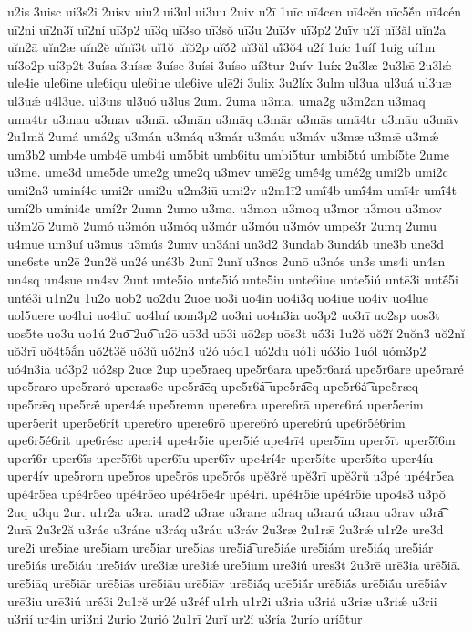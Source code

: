 {u2is
3uisc
ui3s2i
2uisv
uiu2
ui3ul
ui3uu
2uiv
u2ī
1uīc
uī4cen
uī4cĕn
uīc5ĕ́n
uī4cén
uī2ni
uī2n3ĭ
uī2ní
uī3p2
uī3q
uī3so
uī3sŏ
uī3u
2uī3v
uī́3p2
2uī́v
u2ĭ
uĭ3ăl
uĭn2a
uĭn2ā
uĭn2æ
uĭn2ĕ
uĭnĭ3t
uĭ1ŏ
uĭŏ2p
uĭŏ́2
uĭ3ŭl
uĭ́3ŏ4
u2í
1uíc
1uíf
1uíg
uí1m
uí3o2p
uí3p2t
3uísa
3uísæ
3uíse
3uísi
3uíso
uí3tur
2uív
1uíx
2u3læ
2u3lǣ
2u3lǽ
ule4ie
ule6ine
ule6iqu
ule6iue
ule6ive
ulē2i
3ulix
3u2líx
3ulm
ul3ua
ul3uá
ul3uæ
ul3uǽ
u4l3ue.
ul3uīs
ul3uó
u3lus
2um.
2uma
u3ma.
uma2g
u3m2an
u3maq
uma4tr
u3mau
u3mav
u3mā.
u3mān
u3māq
u3mār
u3mās
umā4tr
u3māu
u3māv
2u1mă
2umá
umá2g
u3mán
u3máq
u3már
u3máu
u3máv
u3mæ
u3mǣ
u3mǽ
um3b2
umb4e
umb4ē
umb4i
um5bit
umb6itu
umbi5tur
umbi5tú
umbí5te
2ume
u3me.
ume3d
ume5de
ume2g
ume2q
u3mev
umē2g
umḗ4g
umé2g
umi2b
umi2c
umi2n3
uminí4c
umi2r
umi2u
u2m3iū
umi2v
u2m1ī2
umī́4b
umī́4m
umī́4r
umī́4t
umí2b
umíni4c
umí2r
2umn
2umo
u3mo.
u3mon
u3moq
u3mor
u3mou
u3mov
u3m2ō
2umŏ
2umó
u3món
u3móq
u3mór
u3móu
u3móv
umpe3r
2umq
2umu
u4mue
um3uí
u3mus
u3mús
2umv
un3áni
un3d2
3undab
3undáb
une3b
une3d
une6ste
un2ē
2un2ĕ
un2é
uné3b
2unī
2unĭ
u3nos
2unō
u3nós
un3s
uns4i
un4sn
un4sq
un4sue
un4sv
2unt
unte5io
unte5ió
unte5iu
unte6iue
unte5iú
untē3i
untḗ5i
unté3i
u1n2u
1u2o
uob2
uo2du
2uoe
uo3i
uo4in
uo4i3q
uo4iue
uo4iv
uo4lue
uol5uere
uo4lui
uo4luī
uo4luí
uom3p2
uo3ni
uo4n3ia
uo3p2
uo3rī
uo2sp
uos3t
uos5te
uo3u
uo1ú
2uo͞
2uo͡
u2ō
uō3d
uō3i
uō2sp
uōs3t
uṓ3i
1u2ŏ
uŏ2ĭ
2uŏn3
uŏ2nĭ
uŏ3rī
uŏ4t5ắn
uŏ2t3ĕ
uŏ3ŭ
uŏ́2n3
u2ó
uód1
uó2du
uó1i
uó3io
1uól
uóm3p2
uó4n3ia
uó3p2
uó2sp
2uœ
2up
upe5raeq
upe5r6ara
upe5r6ará
upe5r6are
upe5raré
upe5raro
upe5raró
uperas6c
upe5ra͞eq
upe5r6á͞
upe5ra͡eq
upe5r6á͡
upe5ræq
upe5rǣq
upe5rǣ́
uper4ǽ
upe5remn
upere6ra
upere6rā
upere6rá
uper5erim
uper5erit
uper5e6rít
upere6ro
upere6rō
upere6ró
upere6rú
upe6r5é6rim
upe6r5é6rit
upe6résc
uperi4
upe4r5ie
uper5ié
upe4rī4
uper5īm
uper5īt
uper5ī́6m
uperī́6r
uper6ī́s
uper5ī́6t
uper6ī́u
uper6ī́v
upe4rí4r
uper5íte
uper5íto
uper4íu
uper4ív
upe5rorn
upe5ros
upe5rōs
upe5rṓs
upĕ3rĕ
upĕ3rī
upĕ3rŭ
u3pé
upé4r5ea
upé4r5eā
upé4r5eo
upé4r5eō
upé4r5e4r
upé4ri.
upé4r5ie
upé4r5iē
upo4s3
u3pŏ
2uq
u3qu
2ur.
u1r2a
u3ra.
urad2
u3rae
u3rane
u3raq
u3rarú
u3rau
u3rav
u3ra͡
2urā
2u3r2ă
u3ráe
u3ráne
u3ráq
u3ráu
u3ráv
2u3ræ
2u1rǣ
2u3rǽ
u1r2e
ure3d
ure2i
ure5iae
ure5iam
ure5iar
ure5ias
ure5ia͡
ure5iáe
ure5iám
ure5iáq
ure5iár
ure5iás
ure5iáu
ure5iáv
ure3iæ
ure3iǽ
ure5ium
ure3iú
ures3t
2u3rē
urē3ia
urē5iā.
urē5iāq
urē5iār
urē5iās
urē5iāu
urē5iāv
urē5iā́q
urē5iā́r
urē5iā́s
urē5iā́u
urē5iā́v
urē3iu
urē3iú
urḗ3i
2u1rĕ
ur2é
u3réf
u1rh
u1r2i
u3ria
u3riá
u3riæ
u3riǽ
u3rii
u3rií
ur4in
uri3ni
2urio
2urió
2u1rī
2urĭ
ur2í
u3ría
2urío
urí5tur
}
